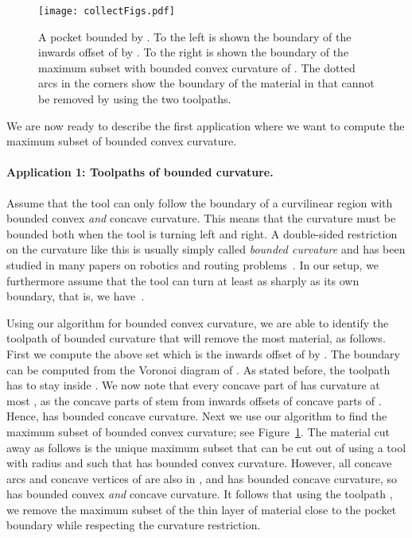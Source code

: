 \documentclass{article}
\begin{document}
\begin{figure}
\centering
\texttt{[image: collectFigs.pdf]}
\caption{A pocket bounded by . To the left is shown
the boundary  of the inwards offset of  by . 
To the right is shown the boundary  of the maximum subset
with bounded
convex curvature of .
The dotted arcs in
the corners show the boundary of the material in 
that cannot be removed by  using the two toolpaths.}
\label{beforeAfterRounding}
\end{figure}

We are now ready to describe the first application where we
want to compute the maximum subset of bounded
convex curvature.

\paragraph{Application 1: Toolpaths of bounded curvature.}
Assume that the tool can only follow the boundary of a curvilinear region with bounded convex \emph{and} concave curvature.
This means that the curvature must be bounded both when the tool is turning left and right.
A double-sided restriction on the curvature like this is usually simply called \emph{bounded curvature} and has been studied in many papers on robotics and routing problems~\cite{agarwal2002curvature,ahn2012reachability,ayala2015length,lazard2002complexity,lee2000approximation}.
In our setup, we furthermore assume that the tool can turn at least as sharply as its own boundary, that is, we have~.

Using our algorithm for bounded convex curvature, we are able to identify the toolpath of bounded curvature that will remove the most material, as follows.
First we compute the above set  which is the inwards offset of  by .
The boundary  can be computed from the Voronoi diagram of  \cite{held1998voronoi}.
As stated before, the toolpath has to stay inside .
We now note that every concave part of  has curvature at most , as the concave parts of  stem from inwards offsets of concave parts of .
Hence,  has bounded concave curvature.
Next we use our algorithm to find the maximum subset  of bounded convex curvature; see Figure~\ref{beforeAfterRounding}.
The material cut away as  follows  is the unique maximum subset that can be cut out of  using a tool with radius  and such that  has bounded convex curvature.
However, all concave arcs and concave vertices of  are also in , and  has bounded concave curvature, so  has bounded convex \emph{and} concave curvature.
It follows that using the toolpath , we remove the maximum subset of the thin layer of material close to the pocket boundary  while respecting the curvature restriction. \\
\end{document}
